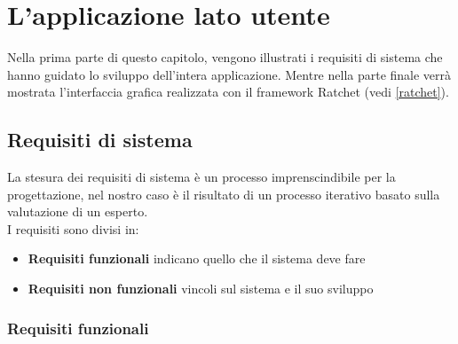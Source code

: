 \chapter{L'applicazione lato utente}
Nella prima parte di questo capitolo, vengono illustrati i requisiti di sistema che hanno guidato lo sviluppo dell'intera applicazione. Mentre nella parte finale verrà mostrata l'interfaccia grafica realizzata con il framework Ratchet (vedi \ref{ratchet}).
\section{Requisiti di sistema}
La stesura dei requisiti di sistema è un processo imprenscindibile per la progettazione, nel nostro caso è il risultato di un processo iterativo basato sulla valutazione di un esperto.\\
I requisiti sono divisi in:
\begin{itemize}
\item \textbf{Requisiti funzionali} indicano quello che il sistema deve fare
\item \textbf{Requisiti non funzionali} vincoli sul sistema e il suo sviluppo
\end{itemize}
 
 \subsection{Requisiti funzionali}

